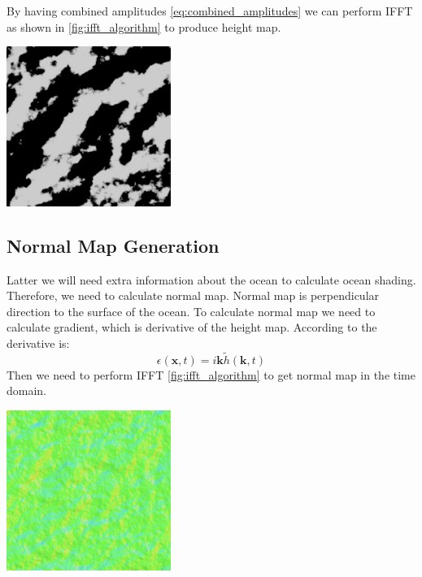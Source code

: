 By having combined amplitudes \ref{eq:combined_amplitudes} we can perform IFFT as shown in \ref{fig:ifft_algorithm} to produce height map.
\begin{minipage}{1\textwidth}
    \centering
    \includegraphics[width=0.40\textwidth]{"images/tma_height.png"}
    \label{fig:tma_height_map}
\end{minipage}

\subsection{Normal Map Generation}
Latter we will need extra information about the ocean to calculate ocean shading. Therefore, we need to calculate normal map. Normal map is perpendicular direction to the surface of the ocean.
To calculate normal map we need to calculate gradient, which is derivative of the height map. According to \cite{tessendorf2004} the derivative is:
\begin{equation}
    \epsilon(\textbf{x}, t) = i\textbf{k} \tilde{h}(\textbf{k}, t)
\end{equation}
Then we need to perform IFFT \ref{fig:ifft_algorithm} to get normal map in the time domain.

\begin{minipage}{1\textwidth}
    \centering
    \includegraphics[width=0.40\textwidth]{"images/tma_normal.png"}
    \label{fig:tma_normal_map}
\end{minipage}

